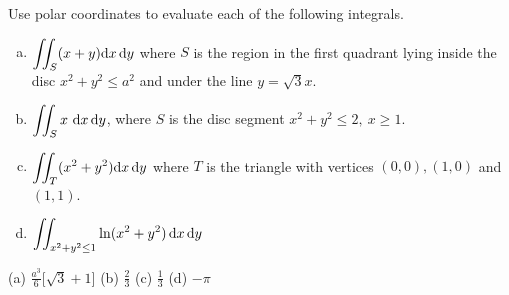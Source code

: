 \begin{question}
Use polar coordinates to evaluate each of the following integrals.
\begin{enumerate}[(a)]
\item
$\displaystyle\iint_S (x+y)\mathrm{d}x\,\mathrm{d}y$ where $S$ is the region 
in the first quadrant lying inside the disc $x^2+y^2\le a^2$ and under 
the line $y=\sqrt{3}x$.
\item 
$\displaystyle\dblInt_Sx\ \dee{x}\,\dee{y}$, where $S$  is the disc segment
$x^2+y^2\le 2,\ x\ge 1$.
\item
$\displaystyle\iint_T (x^2+y^2)\mathrm{d}x\,\mathrm{d}y$ where $T$ is the triangle
with vertices $(0,0), (1,0)$ and $(1,1)$.
\item
$\displaystyle\iint_{x^2+y^2\le 1} \ln(x^2+y^2)\,\mathrm{d}x\,\mathrm{d}y$
\end{enumerate}
\end{question}

%

\begin{answer}
(a) $\frac{a^3}{6}\big[\sqrt{3}+1\big]$\qquad
(b) $\frac{2}{3}$  \qquad
(c) $\frac{1}{3}$ \qquad
(d) $-\pi$
\end{answer}

